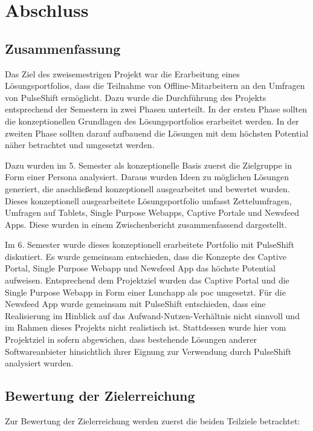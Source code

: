 \chapter{Abschluss}

\section{Zusammenfassung}

Das Ziel des zweisemestrigen Projekt war die Erarbeitung eines Lösungsportfolios, dass die Teilnahme von Offline-Mitarbeitern an den Umfragen von PulseShift ermöglicht. Dazu wurde die Durchführung des Projekts entsprechend der Semestern in zwei Phasen unterteilt. In der ersten Phase sollten die konzeptionellen Grundlagen des Lösungsportfolios erarbeitet werden. In der zweiten Phase sollten darauf aufbauend die Lösungen mit dem höchsten Potential näher betrachtet und umgesetzt werden.

Dazu wurden im 5. Semester als konzeptionelle Basis zuerst die Zielgruppe in Form einer Persona analysiert. Daraus wurden Ideen zu möglichen Lösungen generiert, die anschließend konzeptionell ausgearbeitet und bewertet wurden. Dieses konzeptionell ausgearbeitete Lösungsportfolio umfasst Zettelumfragen, Umfragen auf Tablets, Single Purpose Webapps, Captive Portale und Newsfeed Apps. Diese wurden in einem Zwischenbericht zusammenfassend dargestellt.

Im 6. Semester wurde dieses konzeptionell erarbeitete Portfolio mit PulseShift diskutiert. Es wurde gemeinsam entschieden, dass die Konzepte des Captive Portal, Single Purpose Webapp und Newsfeed App das höchste Potential aufweisen. Entsprechend dem Projektziel wurden das Captive Portal und die Single Purpose Webapp in Form einer Lunchapp als \gls{poc} umgesetzt. Für die Newsfeed App wurde gemeinsam mit PulseShift entschieden, dass eine Realisierung im Hinblick auf das Aufwand-Nutzen-Verhältnis nicht sinnvoll und im Rahmen dieses Projekts nicht realistisch ist. Stattdessen wurde hier vom Projektziel in sofern abgewichen, dass bestehende Lösungen anderer Softwareanbieter hinsichtlich ihrer Eignung zur Verwendung durch PulseShift analysiert wurden.

\section{Bewertung der Zielerreichung}

Zur Bewertung der Zielerreichung werden zuerst die beiden Teilziele betrachtet:


